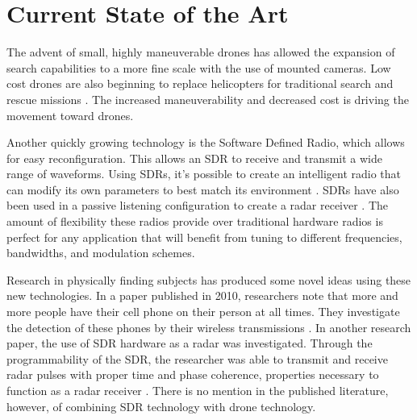 \section{Current State of the Art}
The advent of small, highly maneuverable drones has allowed the expansion of search capabilities to a more fine scale with the use of mounted cameras. Low cost drones are also beginning to replace helicopters for traditional search and rescue missions \cite{drone_replacement}. The increased maneuverability and decreased cost is driving the movement toward drones.\par
Another quickly growing technology is the Software Defined Radio, which allows for easy reconfiguration. This allows an SDR to receive and transmit a wide range of waveforms. Using SDRs, it’s possible to create an intelligent radio that can modify its own parameters to best match its environment \cite{int_radio}. SDRs have also been used in a passive listening configuration to create a radar receiver \cite{radar_conf}. The amount of flexibility these radios provide over traditional hardware radios is perfect for any application that will benefit from tuning to different frequencies, bandwidths, and modulation schemes.\par
Research in physically finding subjects has produced some novel ideas using these new technologies. In a paper published in 2010, researchers note that more and more people have their cell phone on their person at all times. They investigate the detection of these phones by their wireless transmissions \cite{novel_localization}. In another research paper, the use of SDR hardware as a radar was investigated. Through the programmability of the SDR, the researcher was able to transmit and receive radar pulses with proper time and phase coherence, properties necessary to function as a radar receiver \cite{GNR_sdr}. There is no mention in the published literature, however, of combining SDR technology with drone technology.\par
